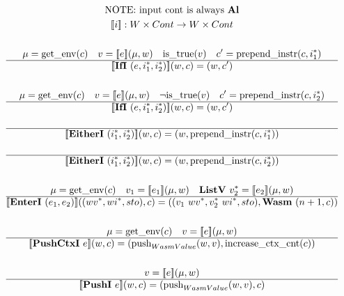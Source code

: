 
\newpage

\begin{gather*}
  \text{NOTE: input cont is always \al} \\
  \sem{i} : W \times Cont \rightarrow W \times Cont \\
%
\newline \\
  \mu = \getenv(c) \quad v = \sem{e}(\mu, w) \quad
  \istrue(v) \quad c' = \prependinstr(c, \seq{i_1}) \\
  \hline
  \sem{\ifi ~ (e, \seq{i_1}, \seq{i_2})}(w, c) = (w, c') \\
%
\newline \\
  \mu = \getenv(c) \quad v = \sem{e}(\mu, w) \quad
  \neg \istrue(v) \quad c' = \prependinstr(c, \seq{i_2}) \\
  \hline
  \sem{\ifi ~ (e, \seq{i_1}, \seq{i_2})}(w, c) = (w, c') \\
%
\newline \\
  \hline
  \sem{\eitheri ~ (\seq{i_1}, \seq{i_2})}(w, c) = (w, \prependinstr(c, \seq{i_1})) \\
%
\newline \\
  \hline
  \sem{\eitheri ~ (\seq{i_1}, \seq{i_2})}(w, c) = (w, \prependinstr(c, \seq{i_2})) \\
%
\newline \\
  \mu = \getenv(c) \quad v_1 = \sem{e_1}(\mu, w) \quad \listv ~ \seq{v_2} = \sem{e_2}(\mu, w) \\
  \hline
  \sem{\enteri ~ (e_1, e_2)}((\seq{wv}, \seq{wi}, sto), c)
  =
  ((v_1 ~ \seq{wv}, \seq{v_2} ~ \seq{wi}, sto), \wasm ~ (n+1, c)) \\
%
\newline \\
  \mu = \getenv(c) \quad v = \sem{e}(\mu, w) \\
  \hline
  \sem{\pushctxi ~ e}(w, c)
  =
  (\push_{WasmValue}(w, v), \increasectxcnt(c)) \\
%
\newline \\
  v = \sem{e}(\mu, w) \\
  \hline
  \sem{\pushi ~ e}(w, c) = (\push_{WasmValue}(w, v), c) \\
%
\newline \\

\end{gather*}
